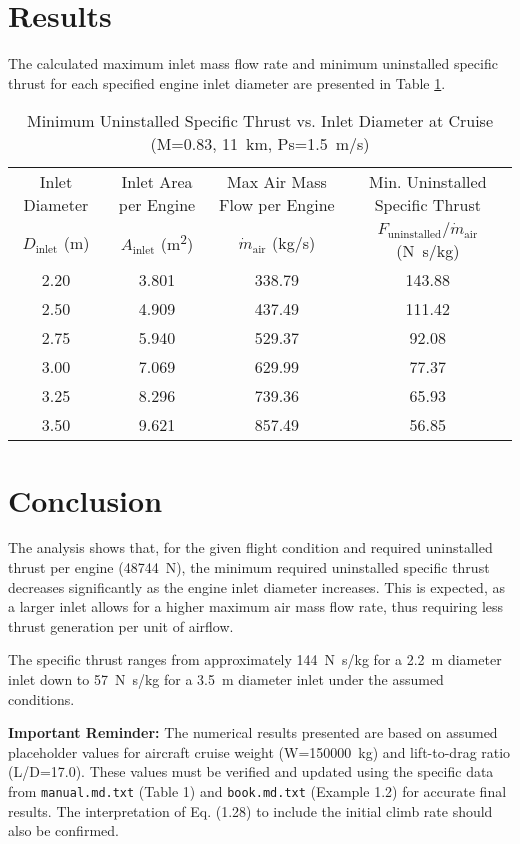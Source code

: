 \documentclass{article}
\begin{document}
\section{Results}

The calculated maximum inlet mass flow rate and minimum uninstalled specific thrust for each specified engine inlet diameter are presented in Table \ref{tab:results}.

\begin{table}[htbp]
    \centering
    \caption{Minimum Uninstalled Specific Thrust vs. Inlet Diameter at Cruise (M=0.83, \SI{11}{km}, Ps=\SI{1.5}{m/s})}
    \label{tab:results}
    \begin{tabular}{@{}cccc@{}}
        \toprule
        Inlet Diameter & Inlet Area per Engine & Max Air Mass Flow per Engine & Min. Uninstalled Specific Thrust \\
        $D_{\text{inlet}}$ (\si{m}) & $A_{\text{inlet}}$ (\si{m^2}) & $\dot{m}_{\text{air}}$ (\si{kg/s}) & $F_{\text{uninstalled}}/\dot{m}_{\text{air}}$ (\si{N.s/kg}) \\
        \midrule
        2.20 & 3.801 & 338.79 & 143.88 \\
        2.50 & 4.909 & 437.49 & 111.42 \\
        2.75 & 5.940 & 529.37 & 92.08 \\
        3.00 & 7.069 & 629.99 & 77.37 \\
        3.25 & 8.296 & 739.36 & 65.93 \\
        3.50 & 9.621 & 857.49 & 56.85 \\
        \bottomrule
    \end{tabular}
\end{table}

\section{Conclusion}

The analysis shows that, for the given flight condition and required uninstalled thrust per engine (\SI{48744}{N}), the minimum required uninstalled specific thrust decreases significantly as the engine inlet diameter increases. This is expected, as a larger inlet allows for a higher maximum air mass flow rate, thus requiring less thrust generation per unit of airflow.

The specific thrust ranges from approximately \SI{144}{N.s/kg} for a \SI{2.2}{m} diameter inlet down to \SI{57}{N.s/kg} for a \SI{3.5}{m} diameter inlet under the assumed conditions.

\textbf{Important Reminder:} The numerical results presented are based on assumed placeholder values for aircraft cruise weight (W=\SI{150000}{kg}) and lift-to-drag ratio (L/D=17.0). These values must be verified and updated using the specific data from \texttt{manual.md.txt} (Table 1) and \texttt{book.md.txt} (Example 1.2) for accurate final results. The interpretation of Eq. (1.28) to include the initial climb rate should also be confirmed.
\end{document}
